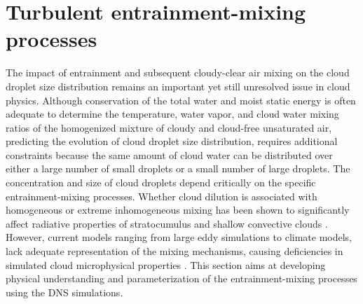 \documentclass[draft,linenumbers]{agujournal}
\begin{document}
\section{Turbulent entrainment-mixing processes}\label{mixing_processes}

The impact of entrainment and subsequent cloudy-clear air mixing on the cloud droplet size distribution remains an important yet still unresolved issue in cloud physics. Although conservation of the total water and moist static energy is often adequate to determine the temperature, water vapor, and cloud water mixing ratios of the homogenized mixture of cloudy and cloud-free unsaturated air,  predicting the evolution of cloud droplet size distribution, requires additional constraints because {\color{green}the same amount of} cloud water can be distributed over either a large number of small droplets or a small number of large droplets. The concentration and size of cloud droplets depend critically on the specific entrainment-mixing processes. Whether cloud dilution is associated with homogeneous or extreme inhomogeneous mixing has been shown to significantly affect radiative properties of stratocumulus \citep{Chosson2007} and shallow convective clouds \citep{Grabowski2006, Slawinska2008}. However, current models ranging from large eddy simulations to climate models, lack adequate representation of the mixing mechanisms, causing deficiencies in simulated cloud microphysical properties \citep{Endo2015}. This section aims at developing physical understanding and parameterization of the entrainment-mixing processes using the DNS simulations. 
\end{document}
